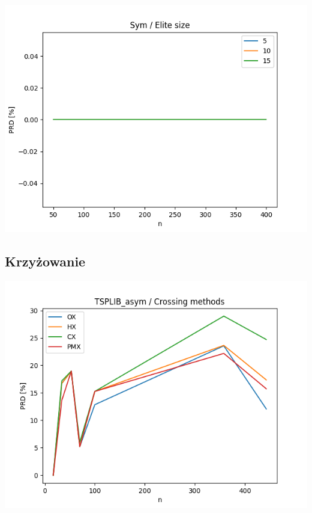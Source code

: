 \documentclass{article}
\begin{document}
\begin{center}
\includegraphics[width=\textwidth, 
                   height = 0.4\textheight, 
                   keepaspectratio]
                  {plots/sym_4_elite_num} 
\end{center}


\subsection{Krzyżowanie}

\begin{center}
\includegraphics[width=\textwidth, 
                   height = 0.4\textheight, 
                   keepaspectratio]
                  {plots/tsplib_asym_5_crossing} 
\end{center}
\end{document}
